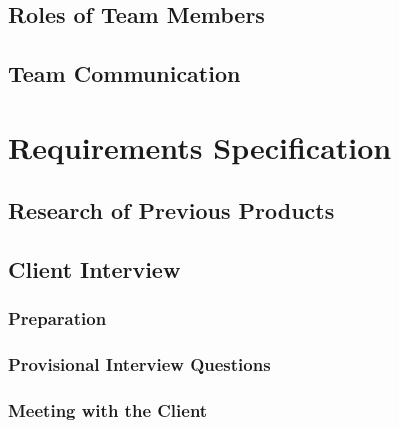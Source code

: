 \documentclass{l3proj}
\begin{document}
\section{Roles of Team Members}

\section{Team Communication}

\chapter{Requirements Specification}
\label{requirementsspecification}

\section{Research of Previous Products}

\section{Client Interview}

\subsection{Preparation}

\subsection{Provisional Interview Questions}

\subsection{Meeting with the Client}

\end{document}

